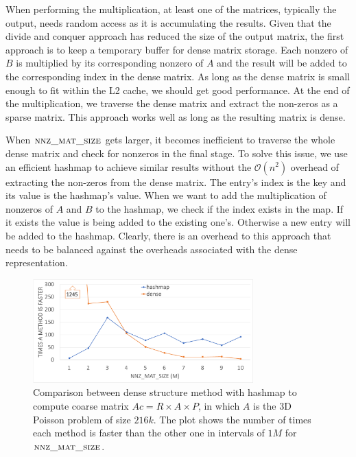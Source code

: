 When performing the multiplication, at least one of the matrices, typically the output, needs random access as it is accumulating the results. Given that the divide and conquer approach has reduced the size of the output matrix, the first approach is to keep a temporary buffer for dense matrix storage. Each nonzero of $B$ is multiplied by its corresponding nonzero of $A$ and the result will be added to the corresponding index in the dense matrix. As long as the dense matrix is small enough to fit within the L2 cache, we should get good performance. At the end of the multiplication, we traverse the dense matrix and extract the non-zeros as a sparse matrix. This approach works well as long as the resulting matrix is dense. 

When $\textsc{nnz\_mat\_size}$ gets larger, it becomes inefficient to traverse the whole dense matrix and check for nonzeros in the final stage. To solve this issue, we use an efficient hashmap to achieve similar results without the $\mathcal{O}(n^2)$ overhead of extracting the non-zeros from the dense matrix. The entry's index is the key and its value is the hashmap's value. When we want to add the multiplication of nonzeros of $A$ and $B$ to the hashmap, we check if the index exists in the map. If it exists the value is being added to the existing one's. Otherwise a new entry will be added to the hashmap. Clearly, there is an overhead to this approach that needs to be balanced against the overheads associated with the dense representation. 

\begin{figure}[tbh]
 \centering
 \includegraphics[width=8.5cm,height=4cm]{./figures/lap60_range.pdf}
 \caption{Comparison between dense structure method with hashmap to compute coarse matrix $Ac = R \times A \times P$, in which $A$ is the 3D Poisson problem of size $216k$. The plot shows the number of times each method is faster than the other one in intervals of $1M$ for $\textsc{nnz\_mat\_size}$.}
 \label{fig:lap60}
 \Description{}
\end{figure}

